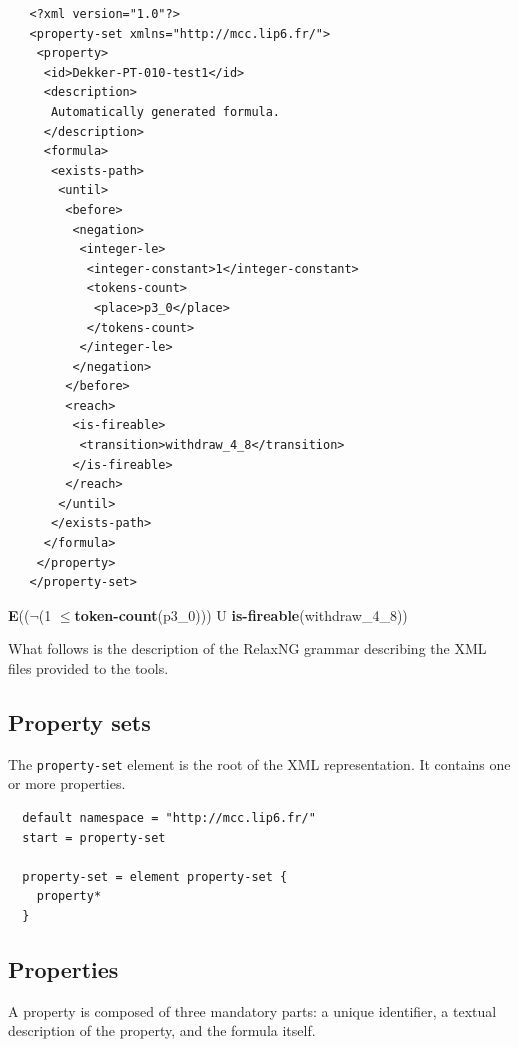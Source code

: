 \documentclass[10pt,english,a4paper]{article}
\newcommand\ctle             {\textbf{E}\xspace}
\newcommand\logicnot         {\boldmath$\lnot$\xspace}
\newcommand\atomleq          {\boldmath$\leq$\xspace}
\newcommand\atomisfire[1]    {\textbf{is-fireable}(#1)}
\newcommand\atomtokenscnt[1] {\textbf{token-count}(#1)}
\newcommand\mysubsection[1]{\color{sectioncolor}\subsection{#1}\color{defaultcolor}}
\begin{document}
\begin{multicols}{2}
\begin{lstlisting}
   <?xml version="1.0"?>
   <property-set xmlns="http://mcc.lip6.fr/">
    <property>
     <id>Dekker-PT-010-test1</id>
     <description>
      Automatically generated formula.
     </description>
     <formula>
      <exists-path>
       <until>
        <before>
         <negation>
          <integer-le>
           <integer-constant>1</integer-constant>
           <tokens-count>
            <place>p3_0</place>
           </tokens-count>
          </integer-le>
         </negation>
        </before>
        <reach>
         <is-fireable>
          <transition>withdraw_4_8</transition>
         </is-fireable>
        </reach>
       </until>
      </exists-path>
     </formula>
    </property>
   </property-set>
\end{lstlisting}
\columnbreak
\vspace*{2cm}
\ctle ((\logicnot (1 \atomleq \atomtokenscnt{p3\_0})) U \atomisfire{withdraw\_4\_8})
\end{multicols}

What follows is the description of the RelaxNG grammar describing the XML
files provided to the tools.

\mysubsection{Property sets}
The \lstinline[language=xsd]!property-set! element is the root of the XML representation.
It contains one or more properties.
\begin{lstlisting}
  default namespace = "http://mcc.lip6.fr/"
  start = property-set

  property-set = element property-set {
    property*
  }
\end{lstlisting}

\mysubsection{Properties}
A property is composed of three mandatory parts: a unique identifier, a textual description
of the property, and the formula itself.

\end{document}
